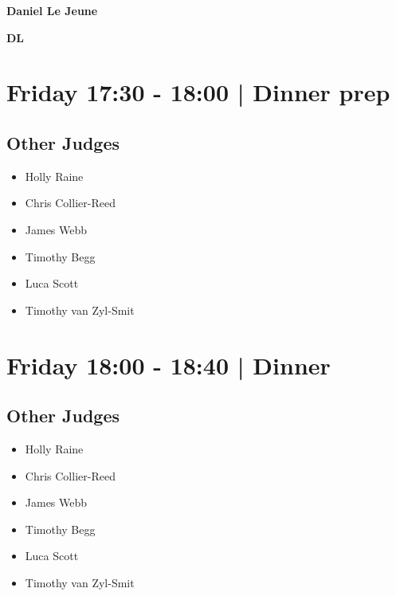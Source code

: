 \documentclass[10pt]{article}
\newcommand{\newtitle}[1]{\begin{center}{\Huge\bfseries #1 }\\ \vspace{5mm}\end{center}}
\newcommand{\newsubtitle}[1]{\begin{center}{\color{grey}\Large\bfseries #1 }\\ \vspace{5mm}\end{center}}
\begin{document}
		\newtitle{Daniel Le Jeune}
	\newsubtitle{DL}

            \section*{Friday 17:30
        -
        18:00
        |
         Dinner prep}
        
                
        \subsection*{Other Judges}
        
            \begin{itemize}
                            \item Holly Raine
                            \item Chris Collier-Reed
                            \item James Webb
                            \item Timothy Begg
                            \item Luca Scott
                            \item Timothy van Zyl-Smit
                        \end{itemize}
        

            \section*{Friday 18:00
        -
        18:40
        |
         Dinner }
        
                
        \subsection*{Other Judges}
        
            \begin{itemize}
                            \item Holly Raine
                            \item Chris Collier-Reed
                            \item James Webb
                            \item Timothy Begg
                            \item Luca Scott
                            \item Timothy van Zyl-Smit
                        \end{itemize}
        
\end{document}
